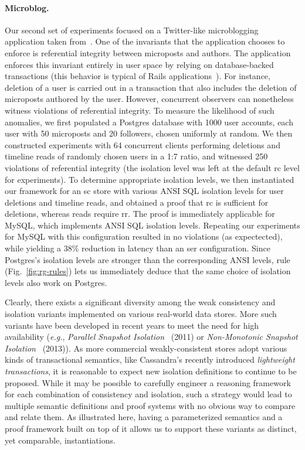 \paragraph{Microblog.} Our second set of experiments focused on a
Twitter-like microblogging application taken from~\cite{railsbook}.
One of the invariants that the application chooses to enforce is
referential integrity between microposts and authors. The application
enforces this invariant entirely in user space by relying on
database-backed transactions (this behavior is typical of Rails
applications~\cite{bailisferal}).  For instance, deletion of a user is
carried out in a transaction that also includes the deletion of
microposts authored by the user.  However, concurrent observers can
nonetheless witness violations of referential integrity. To measure
the likelihood of such anomalies, we first populated a Postgres
database with 1000 user accounts, each user with 50 microposts and 20
followers, chosen uniformly at random. We then constructed experiments
with 64 concurrent clients performing deletions and timeline reads of
randomly chosen users in a 1:7 ratio, and witnessed 250 violations of
referential integrity (the isolation level was left at the default
{\sc rc} level for experiments). To determine appropriate isolation
levels, we then instantiated our framework for an {\sc sc} store with
various ANSI SQL isolation levels for user deletions and timeline
reads, and obtained a proof that {\sc rc} is sufficient for deletions,
whereas reads require {\sc rr}. The proof is immediately applicable
for MySQL, which implements ANSI SQL isolation levels. Repeating our
experiments for MySQL with this configuration resulted in no
violations (as expectected), while yielding a 38\% reduction in
latency than an {\sc ser} configuration.  Since Postgres's isolation
levels are stronger than the corresponding ANSI levels,
 rule (Fig.~\ref{fig:rg-rules}) lets us
immediately deduce that the same choice of isolation levels also work
on Postgres.

Clearly, there exists a significant diversity among the weak
consistency and isolation variants implemented on various real-world
data stores. More such variants have been developed in recent years to
meet the need for high availability (\emph{e.g.}, \emph{Parallel
  Snapshot Isolation}~\cite{psi} (2011) or \emph{Non-Monotonic
  Snapshot Isolation}~\cite{nmsi} (2013)).  As more commercial
weakly-consistent stores adopt various kinds of transactional
semantics, like Cassandra's recently introduced \emph{lightweight
  transactions}, it is reasonable to expect new isolation
definitions to continue to be proposed.  While it may be possible to
carefully engineer a reasoning framework for each combination of
consistency and isolation, such a strategy would lead to multiple
semantic definitions and proof systems with no obvious way to compare
and relate them. As illustrated here, having a parameterized semantics
and a proof framework built on top of it allows us to support these
variants as distinct, yet comparable, instantiations.

